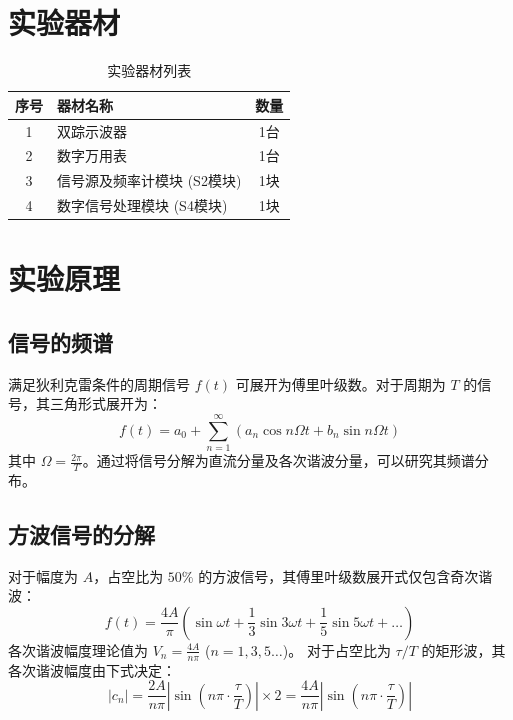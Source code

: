 \documentclass[12pt]{ctexart}
\begin{document}
\section{实验器材}
\begin{table}[H]
    \centering
    \caption{实验器材列表}
    \begin{tabular}{clc}
        \toprule
        \textbf{序号} & \textbf{器材名称} & \textbf{数量} \\
        \midrule
        1 & 双踪示波器 & 1台 \\
        2 & 数字万用表 & 1台 \\
        3 & 信号源及频率计模块 (S2模块) & 1块 \\
        4 & 数字信号处理模块 (S4模块) & 1块 \\
        \bottomrule
    \end{tabular}
\end{table}
\section{实验原理}
\subsection{信号的频谱}
满足狄利克雷条件的周期信号 $f(t)$ 可展开为傅里叶级数。对于周期为 $T$ 的信号，其三角形式展开为：
\begin{equation}
    f(t) = a_0 + \sum_{n=1}^{\infty} (a_n \cos n\Omega t + b_n \sin n\Omega t)
\end{equation}
其中 $\Omega = \frac{2\pi}{T}$。通过将信号分解为直流分量及各次谐波分量，可以研究其频谱分布。
\subsection{方波信号的分解}
对于幅度为 $A$，占空比为 $50\%$ 的方波信号，其傅里叶级数展开式仅包含奇次谐波：
\begin{equation}
    f(t) = \frac{4A}{\pi} \left( \sin \omega t + \frac{1}{3} \sin 3\omega t + \frac{1}{5} \sin 5\omega t + \dots \right)
\end{equation}
各次谐波幅度理论值为 $V_n = \frac{4A}{n\pi}$ ($n=1,3,5\dots$)。
对于占空比为 $\tau/T$ 的矩形波，其各次谐波幅度由下式决定：
\begin{equation}
    |c_n| = \frac{2A}{n\pi} |\sin(n\pi \cdot \frac{\tau}{T})| \times 2 = \frac{4A}{n\pi} |\sin(n\pi \cdot \frac{\tau}{T})|
\end{equation}
\end{document}
